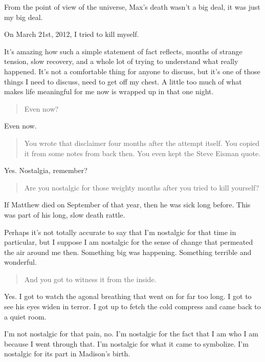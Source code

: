 From the point of view of the universe, Max's death wasn't a big deal, it was just my big deal.

On March 21st, 2012, I tried to kill myself.

It's amazing how such a simple statement of fact reflects, months of strange tension, slow recovery, and a whole lot of trying to understand what really happened. It's not a comfortable thing for anyone to discuss, but it's one of those things I need to discuss, need to get off my chest. A little too much of what makes life meaningful for me now is wrapped up in that one night.

\begin{quote}
Even now?
\end{quote}

Even now.

\begin{quote}
You wrote that disclaimer four months after the attempt itself. You copied it from some notes from back then. You even kept the Steve Eisman quote.
\end{quote}

Yes. Nostalgia, remember?

\begin{quote}
Are you nostalgic for those weighty months after you tried to kill yourself?
\end{quote}

If Matthew died on September of that year, then he was sick long before. This was part of his long, slow death rattle.

Perhaps it's not totally accurate to say that I'm nostalgic for that time in particular, but I suppose I am nostalgic for the sense of change that permeated the air around me then. Something big was happening. Something terrible and wonderful.

\begin{quote}
And you got to witness it from the inside.
\end{quote}

Yes. I got to watch the agonal breathing that went on for far too long. I got to see his eyes widen in terror. I got up to fetch the cold compress and came back to a quiet room.

I'm not nostalgic for that pain, no. I'm nostalgic for the fact that I am who I am because I went through that. I'm nostalgic for what it came to symbolize. I'm nostalgic for its part in Madison's birth.
